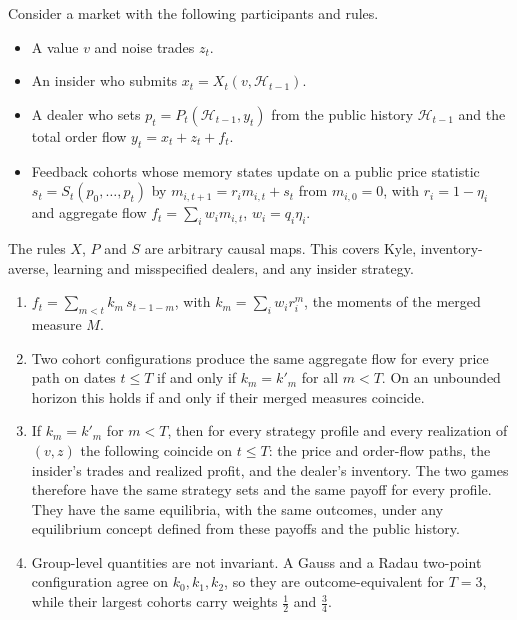 \begin{theorem}\label{thm:eqinv}
Consider a market with the following participants and rules.
\begin{itemize}[itemsep=1pt,topsep=2pt]
\item A value $v$ and noise trades $z_t$.
\item An insider who submits $x_t=X_t(v,\mathcal H_{t-1})$.
\item A dealer who sets $p_t=P_t(\mathcal H_{t-1},y_t)$ from the public history $\mathcal H_{t-1}$ and the total order flow $y_t=x_t+z_t+f_t$.
\item Feedback cohorts whose memory states update on a public price statistic $s_t=S_t(p_0,\ldots,p_t)$ by $m_{i,t+1}=r_im_{i,t}+s_t$ from $m_{i,0}=0$, with $r_i=1-\eta_i$ and aggregate flow $f_t=\sum_iw_im_{i,t}$, $w_i=q_i\eta_i$.
\end{itemize}
The rules $X$, $P$ and $S$ are arbitrary causal maps. This covers Kyle, inventory-averse, learning and misspecified dealers, and any insider strategy.
\begin{enumerate}[label=(\roman*),itemsep=1pt]
\item $f_t=\sum_{m<t}k_m\,s_{t-1-m}$, with $k_m=\sum_iw_ir_i^m$, the moments of the merged measure $M$.
\item Two cohort configurations produce the same aggregate flow for every price path on dates $t\le T$ if and only if $k_m=k'_m$ for all $m<T$. On an unbounded horizon this holds if and only if their merged measures coincide.
\item If $k_m=k'_m$ for $m<T$, then for every strategy profile and every realization of $(v,z)$ the following coincide on $t\le T$: the price and order-flow paths, the insider's trades and realized profit, and the dealer's inventory. The two games therefore have the same strategy sets and the same payoff for every profile. They have the same equilibria, with the same outcomes, under any equilibrium concept defined from these payoffs and the public history.
\item Group-level quantities are not invariant. A Gauss and a Radau two-point configuration agree on $k_0,k_1,k_2$, so they are outcome-equivalent for $T=3$, while their largest cohorts carry weights $\tfrac12$ and $\tfrac34$.
\end{enumerate}
\end{theorem}

